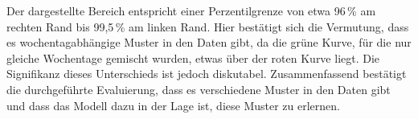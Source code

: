 Der dargestellte Bereich entspricht einer Perzentilgrenze von etwa 96\,\% am rechten Rand bis 99,5\,\% am linken Rand.
Hier bestätigt sich die Vermutung, dass es wochentagabhängige Muster in den Daten gibt, da die grüne Kurve, für die nur gleiche Wochentage gemischt wurden, etwas über der roten Kurve liegt.
Die Signifikanz dieses Unterschieds ist jedoch diskutabel.
Zusammenfassend bestätigt die durchgeführte Evaluierung, dass es verschiedene Muster in den Daten gibt und dass das Modell dazu in der Lage ist, diese Muster zu erlernen.
